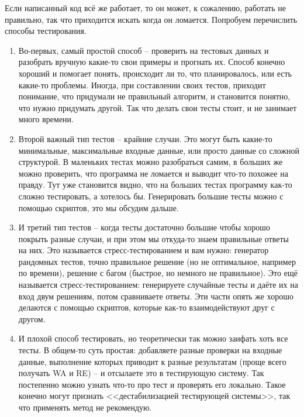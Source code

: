 Если написанный код всё же работает, то он может, к сожалению, работать не правильно, так что приходится искать когда он ломается. Попробуем перечислить способы тестирования.

\begin{enumerate}
    \item Во-первых, самый простой способ -- проверить на тестовых данных и разобрать вручную какие-то свои примеры и прогнать их. Способ конечно хороший и помогает понять, происходит ли то, что планировалось, или есть какие-то проблемы. Иногда, при составлении своих тестов, приходит понимание, что придумали не правильный алгоритм, и становится понятно, что нужно придумать другой. Так что делать свои тесты стоит, и не занимает много времени.

    \item Второй важный тип тестов -- крайние случаи. Это могут быть какие-то минимальные, максимальные входные данные, или просто данные со сложной структурой. В маленьких тестах можно разобраться самим, в больших же можно проверить, что программа не ломается и выводит что-то похожее на правду. Тут уже становится видно, что на больших тестах программу как-то сложно тестировать, а хотелось бы. Генерировать большие тесты можно с помощью скриптов, это мы обсудим дальше.

    \item И третий тип тестов -- когда тесты достаточно большие чтобы хорошо покрыть разные случаи, и при этом мы откуда-то знаем правильные ответы на них. Это называется стресс-тестированием и вам нужно: генератор рандомных тестов, точно правильное решение (но не оптимальное, например по времени), решение с багом (быстрое, но немного не правильное). Это ещё называется стресс-тестированием: генерируете случайные тесты и даёте их на вход двум решениям, потом сравниваете ответы. Эти части опять же хорошо делаются с помощью скриптов, которые как-то взаимодействуют друг с другом.

    \item И плохой способ тестировать, но теоретически так можно заифать хоть все тесты. В общем-то суть простая: добавляете разные проверки на входные данные, выполнение которых приводит к разные результатам (проще всего получать WA и RE) -- и отсылаете это в тестирующую систему. Так постепенно можно узнать что-то про тест и проверять его локально. Такое конечно могут признать <<дестабилизацией тестирующей системы>>, так что применять метод не рекомендую.
\end{enumerate}


